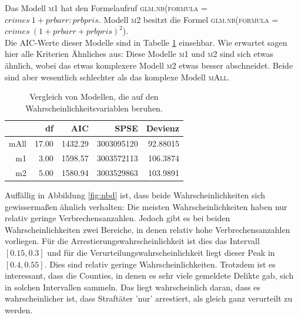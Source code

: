 Das Modell \textsc{m1} hat den Formelaufruf \textsc{glm.nb(formula = $crimes ~ 1 + prbarr:prbpris$}.
Modell \textsc{m2} besitzt die Formel \textsc{glm.nb(formula = $crimes ~ (1 + prbarr + prbpris)^2$)}. \\
Die AIC-Werte dieser Modelle sind in Tabelle \ref{tab:sfm} einsehbar.
Wie erwartet sagen hier alle Kriterien \"Ahnliches aus:
Diese Modelle \textsc{m1} und \textsc{m2} sind sich etwas \"ahnlich, wobei das etwas komplexere Modell \textsc{m2} etwas besser abschneidet.
Beide sind aber wesentlich schlechter als das komplexe Modell \textsc{mAll}. 

\begin{table}[ht]
\centering
\begin{tabular}{rrrrr}
  \hline
 & df & AIC & SPSE & Devienz\\ 
  \hline
mAll & 17.00 & 1432.29 & 3003095120 & 92.88015 \\ 
  m1 & 3.00 & 1598.57 & 3003572113 & 106.3874\\ 
  m2 & 5.00 & 1580.94 & 3003529863 & 103.9891\\ 
   \hline
\end{tabular}
\caption[Vergleich Modelle aus Wahrscheinlichkeitsvariablen]{Vergleich von Modellen, die auf den Wahrscheinlichkeitsvariablen beruhen.}
\label{tab:sfm}
\end{table}

Auff\"allig in Abbildung \ref{fig:nbd} ist, dass beide Wahrscheinlichkeiten sich gewisserma\ss{}en \"ahnlich verhalten:
Die meisten Wahrscheinlichkeiten haben nur relativ geringe Verbrechensanzahlen.
Jedoch gibt es bei beiden Wahrscheinlichkeiten zwei Bereiche, in denen relativ hohe Verbrechensanzahlen vorliegen.
F\"ur die Arrestierungswahrscheinlichkeit ist dies das Intervall $[0.15, 0.3]$ und f\"ur die Verurteilungswahrscheinlichkeit liegt dieser Peak in $[0.4, 0.55]$.
Dies sind relativ geringe Wahrscheinlichkeiten.
Trotzdem ist es interessant, dass die Counties, in denen es sehr viele gemeldete Delikte gab, sich in solchen Intervallen sammeln.
Das liegt wahrscheinlich daran, dass es wahrscheinlicher ist, dass Straft\"ater 'nur' arrestiert, als gleich ganz verurteilt zu werden.
 

